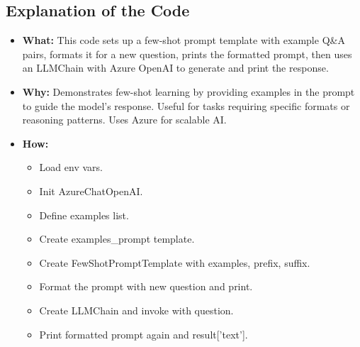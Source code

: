 \documentclass[11pt, a4paper]{article}
\begin{document}
\subsection{Explanation of the Code}
\begin{itemize}
    \item \textbf{What:} This code sets up a few-shot prompt template with example Q\&A pairs, formats it for a new question, prints the formatted prompt, then uses an LLMChain with Azure OpenAI to generate and print the response.
    \item \textbf{Why:} Demonstrates few-shot learning by providing examples in the prompt to guide the model's response. Useful for tasks requiring specific formats or reasoning patterns. Uses Azure for scalable AI.
    \item \textbf{How:}
    \begin{itemize}
        \item Load env vars.
        \item Init AzureChatOpenAI.
        \item Define examples list.
        \item Create examples\_prompt template.
        \item Create FewShotPromptTemplate with examples, prefix, suffix.
        \item Format the prompt with new question and print.
        \item Create LLMChain and invoke with question.
        \item Print formatted prompt again and result['text'].
    \end{itemize}
\end{itemize}
\end{document}

